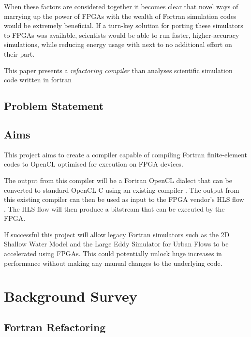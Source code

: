 \documentclass{mpaper}
\begin{document}
When these factors are considered together it becomes clear that novel ways of marrying up the power of FPGAs with the wealth of Fortran simulation codes would be extremely beneficial. If a turn-key solution for porting these simulators to FPGAs was available, scientists would be able to run faster, higher-accuracy simulations, while reducing energy usage with next to no additional effort on their part. 

This paper presents a \textit{refactoring compiler} than analyses scientific simulation code written in fortran 

\subsection{Problem Statement}



\subsection{Aims}

This project aims to create a compiler capable of compiling Fortran finite-element codes to OpenCL optimised for execution on FPGA devices. 

The output from this compiler will be a Fortran OpenCL dialect that can be converted to standard OpenCL C using an existing compiler \cite{VanderbauwhedeDavidson2018}. The output from this existing compiler can then be used as input to the FPGA vendor's HLS flow \cite{IntelCorporation, Xilinx}. The HLS flow will then produce a bitstream that can be executed by the FPGA. 

If successful this project will allow legacy Fortran simulators such as the 2D Shallow Water Model \cite{Hall2009} and the Large Eddy Simulator for Urban Flows \cite{Nakayama2011} to be accelerated using FPGAs. This could potentially unlock huge increases in performance without making any manual changes to the underlying code.

\section{Background Survey}

\subsection{Fortran Refactoring}
\end{document}
